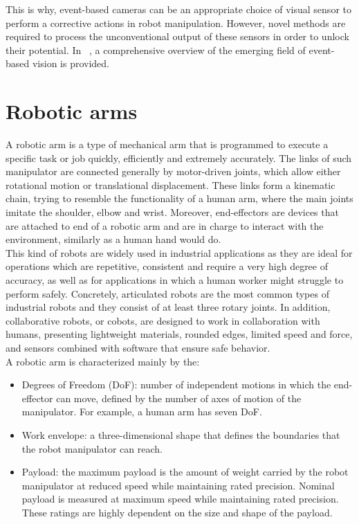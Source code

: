 This is why, event-based cameras can be an appropriate choice of visual sensor to perform a corrective actions in robot manipulation. However, novel methods are required to process the unconventional output of these sensors in order to unlock their potential. In ~\cite{gallego2020}, a comprehensive overview of the emerging field of event-based vision is provided.

\section{Robotic arms}

A robotic arm is a type of mechanical arm that is programmed to execute a specific task or job quickly, efficiently and extremely accurately. The links of such manipulator are connected generally by motor-driven joints, which allow either rotational motion or translational displacement. These links form a kinematic chain, trying to resemble the functionality of a human arm, where the main joints imitate the shoulder, elbow and wrist. Moreover, end-effectors are devices that are attached to end of a robotic arm and are in charge to interact with the environment, similarly as a human hand would do.\\

This kind of robots are widely used in industrial applications as they are ideal for operations which are repetitive, consistent and require a very high degree of accuracy, as well as for applications in which a human worker might struggle to perform safely. Concretely, articulated robots are the most common types of industrial robots and they consist of at least three rotary joints. In addition, collaborative robots, or cobots, are designed to work in collaboration with humans, presenting lightweight materials, rounded edges, limited speed and force, and sensors combined with software that ensure safe behavior.\\

A robotic arm is characterized mainly by the:

\begin{itemize}
	\item Degrees of Freedom (DoF): number of independent motions in which the end-effector can move, defined by the number of axes of motion of the manipulator. For example, a human arm has seven DoF.
	\item Work envelope: a three-dimensional shape that defines the boundaries that the robot manipulator can reach.
	\item Payload: the maximum payload is the amount of weight carried by the robot manipulator at reduced speed while maintaining rated precision. Nominal payload is measured at maximum speed while maintaining rated precision. These ratings are highly dependent on the size and shape of the payload. 
\end{itemize}

